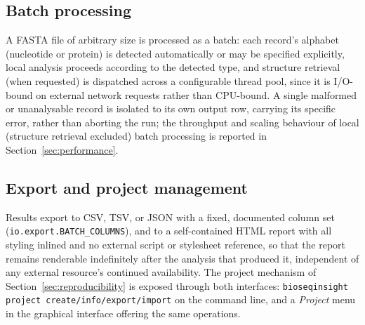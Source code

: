 \subsection{Batch processing}
\label{sec:batch}

A FASTA file of arbitrary size is processed as a batch: each record's
alphabet (nucleotide or protein) is detected automatically or may be
specified explicitly, local analysis proceeds according to the detected
type, and structure retrieval (when requested) is dispatched across a
configurable thread pool, since it is I/O-bound on external network
requests rather than CPU-bound. A single malformed or unanalysable record is
isolated to its own output row, carrying its specific error, rather than
aborting the run; the throughput and scaling behaviour of local (structure
retrieval excluded) batch processing is reported in
Section~\ref{sec:performance}.

\subsection{Export and project management}
\label{sec:export}

Results export to CSV, TSV, or JSON with a fixed, documented column set
(\texttt{io.export.BATCH\_COLUMNS}), and to a self-contained HTML report with
all styling inlined and no external script or stylesheet reference, so that
the report remains renderable indefinitely after the analysis that produced
it, independent of any external resource's continued availability. The
project mechanism of Section~\ref{sec:reproducibility} is exposed through
both interfaces: \texttt{bioseqinsight project create/info/export/import}
on the command line, and a \emph{Project} menu in the graphical interface
offering the same operations.
